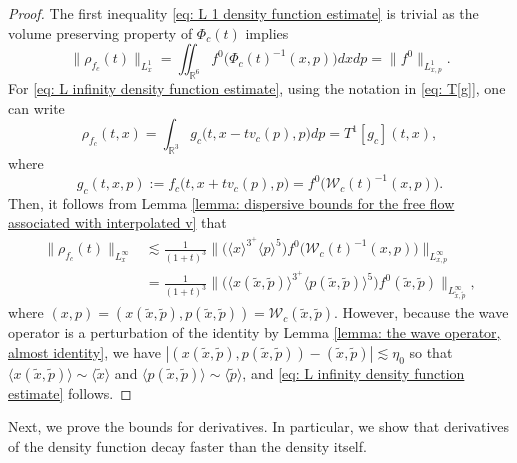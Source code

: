 \documentclass[reqno, 11pt, letterpaper]{amsart}
\theoremstyle{remark}
\numberwithin{equation}{section}
\numberwithin{theorem}{section}
\numberwithin{table}{section}
\numberwithin{figure}{section}
\begin{document}
\begin{proof}
The first inequality \eqref{eq: L 1 density function estimate} is trivial as the volume preserving property of $\Phi_c(t)$ implies
$$\|\rho_{f_c}(t)\|_{L_x^1}=\iint_{\mathbb{R}^6}f^0\Big(\Phi_c(t)^{-1}(x,p)\Big)dxdp=\|f^0\|_{L_{x,p}^1}.$$
For \eqref{eq: L infinity density function estimate}, using the notation in \eqref{eq: T[g]}, one can write 
\begin{equation}\label{eq: rho_c T1 expression}
\rho_{f_c}(t,x) 
= \int_{\mathbb{R}^3} g_c \Big(t, x-tv_c(p),p \Big) dp=T^1[g_c](t,x),
\end{equation}
where 
\begin{equation}\label{eq: gc definition0}
g_c(t,x,p):=f_c\Big(t,x+tv_c(p),p\Big)=f^0\Big(\mathcal{W}_c(t)^{-1}(x,p)\Big).
\end{equation}
Then, it follows from Lemma \ref{lemma: dispersive bounds for the free flow associated with interpolated v} that 
$$\begin{aligned}
\|\rho_{f_c}(t)\|_{L_x^\infty}&\lesssim\frac{1}{(1+t)^3}\Big\|\Big(\langle x\rangle^{3^+}\langle p\rangle^{5}\Big)f^0\Big(\mathcal{W}_c(t)^{-1}(x,p)\Big)\Big\|_{L_{x,p}^\infty}\\
&=\frac{1}{(1+t)^3}\Big\|\Big(\langle x(\tilde{x},\tilde{p})\rangle^{3^+}\langle p(\tilde{x},\tilde{p})\rangle^{5}\Big)f^0(\tilde{x},\tilde{p})\Big\|_{L_{\tilde{x},\tilde{p}}^\infty},
\end{aligned}$$
where $(x,p)=(x(\tilde{x},\tilde{p}),p(\tilde{x},\tilde{p}))=\mathcal{W}_c(\tilde{x},\tilde{p})$. However, because the wave operator is a perturbation of the identity by Lemma \ref{lemma:  the wave operator, almost identity}, we have $|(x(\tilde{x},\tilde{p}),p(\tilde{x},\tilde{p}))-(\tilde{x},\tilde{p})|\lesssim\eta_0$ so that
$\langle x(\tilde{x},\tilde{p})\rangle\sim\langle \tilde{x}\rangle $ and $\langle p(\tilde{x},\tilde{p})\rangle\sim\langle \tilde{p}\rangle$, 
and \eqref{eq: L infinity density function estimate} follows.
\end{proof}

Next, we prove the bounds for derivatives. In particular, we show that derivatives of the density function decay faster than the density itself.
\end{document}
